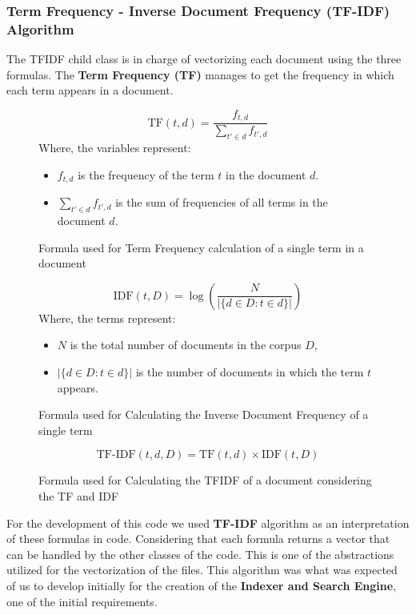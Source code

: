\documentclass{article}
\begin{document}
\subsubsection{Term Frequency - Inverse Document Frequency (TF-IDF) Algorithm}
The TFIDF child class is in charge of vectorizing each document using the three formulas. The \textbf{Term Frequency (TF)} manages to get the frequency in which each term appears in a document. 
\begin{figure}[H]
    \[
    \text{TF}(t, d) = \frac{f_{t,d}}{\sum_{t' \in d} f_{t',d}}
    \]
    Where, the variables represent:
    \begin{itemize}
        \item \( f_{t,d} \) is the frequency of the term \( t \) in the document \( d \).
        \item \( \sum_{t' \in d} f_{t',d} \) is the sum of frequencies of all terms in the document \( d \).
    \end{itemize}
    \caption{Formula used for Term Frequency calculation of a single term in a document}
    \label{fig:TermFrequency}
\end{figure}
\begin{figure}[H]
    \[
    \text{IDF}(t, D) = \log\left(\frac{N}{| \{ d \in D : t \in d \} |}\right)
    \]
    Where, the terms represent:
    \begin{itemize}
        \item \( N \) is the total number of documents in the corpus \( D \),
        \item \( | \{ d \in D : t \in d \} | \) is the number of documents in which the term \( t \) appears.
    \end{itemize}
    \caption{Formula used for Calculating the Inverse Document Frequency of a single term}
    \label{fig:InverseDocumentFrequency}
\end{figure}
\begin{figure}[H]
    \[
    \text{TF-IDF}(t, d, D) = \text{TF}(t, d) \times \text{IDF}(t, D)
    \]
    \caption{Formula used for Calculating the TFIDF of a document considering the TF and IDF}
    \label{fig:TFIDF}
\end{figure}
For the development of this code we used \textbf{TF-IDF} algorithm as an interpretation of these formulas in code. Considering that each formula returns a vector that can be handled by the other classes of the code. This is one of the abstractions utilized for the vectorization of the files.
\newline
\indent This algorithm was what was expected of us to develop initially for the creation of the \textbf{Indexer and Search Engine}, one of the initial requirements.
\end{document}
